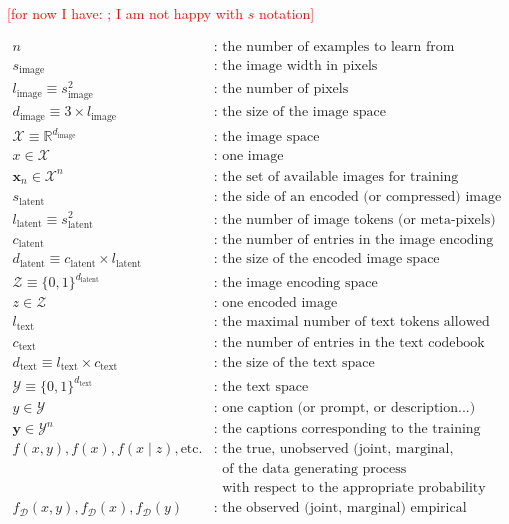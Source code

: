 \documentclass{article}
\begin{document}
\textcolor{red}{[for now I have: ; I am not happy with $s$ notation]}

\newcommand{\si}{s_{\mathrm{image}}}
\newcommand{\li}{l_{\mathrm{image}}}
\newcommand{\di}{d_{\mathrm{image}}}
\newcommand{\xn}{\mathbf{x}_n}
\newcommand{\yn}{\mathbf{y}_n}
\newcommand{\llat}{{l_{\mathrm{latent}}}}
\newcommand{\dl}{{d_{\mathrm{latent}}}}
\newcommand{\lt}{{l_{\mathrm{text}}}}
\newcommand{\ct}{{c_{\mathrm{text}}}}
\newcommand{\dt}{{d_{\mathrm{text}}}}
\newcommand{\fd}{{f_{\mathcal{D}}}}

$$
\begin{aligned}
n & \text{: the number of examples to learn from} \\
\si & \text{: the image width in pixels} \\
\li \equiv s_{\text{image}}^2 & \text{: the number of pixels} \\
\di \equiv3\times l_{\text{image}} & \text{: the size of the image space} \\
\mathcal{X}\equiv \mathbb{R}^{d_{\text{image}}} & \text{: the image space} \\
x \in \mathcal{X} & \text{: one image} \\
\xn \in \mathcal{X}^n & \text{: the set of available images for training} \\
s_\text{latent} & \text{: the side of an encoded (or compressed) image} \\
\llat\equiv s_\text{latent}^2 & \text{: the number of image tokens (or meta-pixels) in an encoded image} \\
c_\text{latent} & \text{: the number of entries in the image encoding codebook} \\
d_\text{latent} \equiv c_\text{latent} \times l_\text{latent} & \text{: the size of the encoded image space} \\
\mathcal{Z}\equiv\{0,1\}^{d_\text{latent}} & \text{: the image encoding space} \\
z \in \mathcal{Z} & \text{: one encoded image} \\
\lt & \text{: the maximal number of text tokens allowed} \\
\ct & \text{: the number of entries in the text codebook (or dictionary)} \\
\dt \equiv \lt \times \ct & \text{: the size of the text space} \\
\mathcal{Y}\equiv \{0,1\}^{\dt} & \text{: the text space} \\
y \in \mathcal{Y} & \text{: one caption (or prompt, or description...)} \\
\mathbf{y} \in \mathcal{Y}^n & \text{: the captions corresponding to the training images} \\
f(x,y), f(x), f(x \mid z), \text{etc.} & \text{: the true, unobserved (joint, marginal, conditional) density} \\
& \phantom{\text{: }}\text{of the data generating process} \\
& \phantom{\text{: }}\text{with respect to the appropriate probability measure} \\
\fd(x,y), \fd(x), \fd(y) & \text{: the observed (joint, marginal) empirical density}
\end{aligned}
$$
\end{document}
